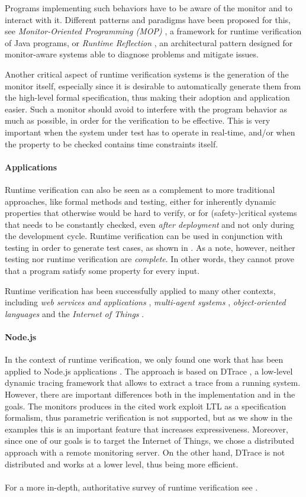 Programs implementing such behaviors have to be aware of the monitor and to interact with it.
Different patterns and paradigms have been proposed for this, see \emph{Monitor-Oriented Programming (MOP)} \cite{mop}, a framework for runtime verification of Java programs, or \emph{Runtime Reflection} \cite{rr}, an architectural pattern designed for monitor-aware systems able to diagnose problems and mitigate issues.

Another critical aspect of runtime verification systems is the generation of the monitor itself, especially since it is desirable to automatically generate them from the high-level formal specification, thus making their adoption and application easier.
Such a monitor should avoid to interfere with the program behavior as much as possible, in order for the verification to be effective.
This is very important when the system under test has to operate in real-time, and/or when the property to be checked contains time constraints itself.

\paragraph{Applications}
Runtime verification can also be seen as a complement to more traditional approaches, like formal methods and testing, either for inherently dynamic properties that otherwise would be hard to verify, or for (safety-)critical systems that needs to be constantly checked, even \emph{after deployment} and not only during the development cycle.
Runtime verification can be used in conjunction with testing in order to generate test cases, as shown in \cite{artho2005combining}.
As a note, however, neither testing nor runtime verification are \emph{complete}.
In other words, they cannot prove that a program satisfy some property for every input.

Runtime verification has been successfully applied to many other contexts, including \emph{web services and applications} \cite{webservices, webapps}, \emph{multi-agent systems} \cite{AnconaDM12}, \emph{object-oriented languages} \cite{pql, javadynamic, de2014combining, BoerEtAl14} and the \emph{Internet of Things} \cite{rviot1, rviot2}.

\paragraph{Node.js}
In the context of runtime verification, we only found one work that has been applied to Node.js applications \cite{Rosenberg2016}.
The approach is based on DTrace \cite{dtrace}, a low-level dynamic tracing framework that allows to extract a trace from a running system.
However, there are important differences both in the implementation and in the goals.
The monitors produces in the cited work exploit LTL \cite{ltl} as a specification formalism, thus parametric verification is not supported, but as we show in the examples this is an important feature that increases expressiveness.
Moreover, since one of our goals is to target the Internet of Things, we chose a distributed approach with a remote monitoring server.
On the other hand, DTrace is not distributed and works at a lower level, thus being more efficient.

\paragraph*{}
For a more in-depth, authoritative survey of runtime verification see \cite{rv}.

